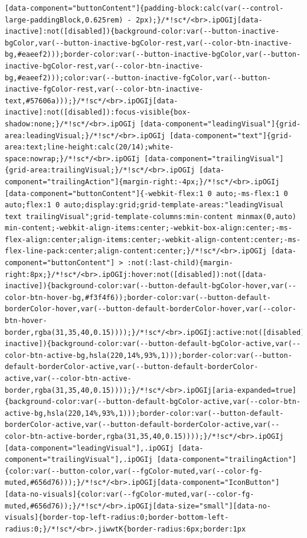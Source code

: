 \documentclass[
  letterpaper,
]{book}
\begin{document}
\begin{verbatim}
[data-component="buttonContent"]{padding-block:calc(var(--control-large-paddingBlock,0.625rem) - 2px);}/*!sc*/<br>.ipOGIj[data-inactive]:not([disabled]){background-color:var(--button-inactive-bgColor,var(--button-inactive-bgColor-rest,var(--color-btn-inactive-bg,#eaeef2)));border-color:var(--button-inactive-bgColor,var(--button-inactive-bgColor-rest,var(--color-btn-inactive-bg,#eaeef2)));color:var(--button-inactive-fgColor,var(--button-inactive-fgColor-rest,var(--color-btn-inactive-text,#57606a)));}/*!sc*/<br>.ipOGIj[data-inactive]:not([disabled]):focus-visible{box-shadow:none;}/*!sc*/<br>.ipOGIj [data-component="leadingVisual"]{grid-area:leadingVisual;}/*!sc*/<br>.ipOGIj [data-component="text"]{grid-area:text;line-height:calc(20/14);white-space:nowrap;}/*!sc*/<br>.ipOGIj [data-component="trailingVisual"]{grid-area:trailingVisual;}/*!sc*/<br>.ipOGIj [data-component="trailingAction"]{margin-right:-4px;}/*!sc*/<br>.ipOGIj [data-component="buttonContent"]{-webkit-flex:1 0 auto;-ms-flex:1 0 auto;flex:1 0 auto;display:grid;grid-template-areas:"leadingVisual text trailingVisual";grid-template-columns:min-content minmax(0,auto) min-content;-webkit-align-items:center;-webkit-box-align:center;-ms-flex-align:center;align-items:center;-webkit-align-content:center;-ms-flex-line-pack:center;align-content:center;}/*!sc*/<br>.ipOGIj [data-component="buttonContent"] > :not(:last-child){margin-right:8px;}/*!sc*/<br>.ipOGIj:hover:not([disabled]):not([data-inactive]){background-color:var(--button-default-bgColor-hover,var(--color-btn-hover-bg,#f3f4f6));border-color:var(--button-default-borderColor-hover,var(--button-default-borderColor-hover,var(--color-btn-hover-border,rgba(31,35,40,0.15))));}/*!sc*/<br>.ipOGIj:active:not([disabled]):not([data-inactive]){background-color:var(--button-default-bgColor-active,var(--color-btn-active-bg,hsla(220,14%,93%,1)));border-color:var(--button-default-borderColor-active,var(--button-default-borderColor-active,var(--color-btn-active-border,rgba(31,35,40,0.15))));}/*!sc*/<br>.ipOGIj[aria-expanded=true]{background-color:var(--button-default-bgColor-active,var(--color-btn-active-bg,hsla(220,14%,93%,1)));border-color:var(--button-default-borderColor-active,var(--button-default-borderColor-active,var(--color-btn-active-border,rgba(31,35,40,0.15))));}/*!sc*/<br>.ipOGIj [data-component="leadingVisual"],.ipOGIj [data-component="trailingVisual"],.ipOGIj [data-component="trailingAction"]{color:var(--button-color,var(--fgColor-muted,var(--color-fg-muted,#656d76)));}/*!sc*/<br>.ipOGIj[data-component="IconButton"][data-no-visuals]{color:var(--fgColor-muted,var(--color-fg-muted,#656d76));}/*!sc*/<br>.ipOGIj[data-size="small"][data-no-visuals]{border-top-left-radius:0;border-bottom-left-radius:0;}/*!sc*/<br>.jiwwtK{border-radius:6px;border:1px 
\end{verbatim}
\end{document}
